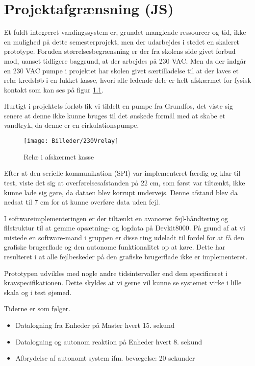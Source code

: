 \chapter{Projektafgrænsning (JS)}

Et fuldt integreret vandingssystem er, grundet manglende ressourcer og tid, ikke en mulighed på dette semesterprojekt, men der udarbejdes i stedet en skaleret prototype.
Foruden størrelsesbegrænsning er der fra skolens side givet forbud mod, uanset tidligere baggrund, at der arbejdes på 230 VAC. Men da der indgår en 230 VAC pumpe i projektet har skolen givet særtilladelse til at der laves et relæ-kredsløb i en lukket kasse, hvori alle ledende dele er helt afskærmet for fysisk kontakt som kan ses på figur \ref{lab:230Vrelay}.

Hurtigt i projektets forløb fik vi tildelt en pumpe fra Grundfos, det viste sig senere at denne ikke kunne bruges til det ønskede formål med at skabe et vandtryk, da denne er en cirkulationspumpe. 


\begin{figure}[H]
  \centering
    \texttt{[image: Billeder/230Vrelay]}
    \caption{Relæ i afskærmet kasse}
    \label{lab:230Vrelay}
\end{figure}

Efter at den serielle kommunikation (SPI) var implementeret færdig og klar til test, viste det sig at overførelsesafstanden på 22 cm, som først var tiltænkt, ikke kunne lade sig gøre, da dataen blev korrupt undervejs. Denne afstand blev da nedsat til 7 cm for at kunne overføre data uden fejl.
 
I softwareimplementeringen er der tiltænkt en  avanceret fejl-håndtering og filstruktur til at gemme opsætning- og logdata på Devkit8000. På grund af at vi mistede en software-mand i gruppen er disse ting udeladt til fordel for at få den grafiske brugerflade og den autonome funktionalitet op at køre. Dette har resulteret i at alle fejlbeskeder på den grafiske brugerflade ikke er implementeret.

Prototypen udvikles med nogle andre tidsintervaller end dem specificeret i kravspecifikationen. Dette skyldes at vi gerne vil kunne se systemet virke i lille skala og i test øjemed.

Tiderne er som følger.

\begin{itemize}
	\item Datalogning fra Enheder på Master hvert 15. sekund
	\item Datalogning og autonom reaktion på Enheder hvert 8. sekund
	\item Afbrydelse af autonomt system ifm. bevægelse: 20 sekunder
\end{itemize}